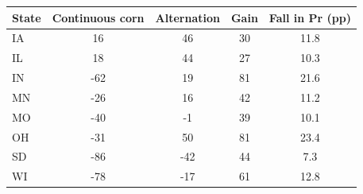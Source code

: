 \begin{tabular}{lcccc}
\toprule
State & Continuous corn & Alternation & Gain & Fall in Pr (pp)\\
\midrule
IA & 16 & 46 & 30 & 11.8 \\
IL & 18 & 44 & 27 & 10.3 \\
IN & -62 & 19 & 81 & 21.6 \\
MN & -26 & 16 & 42 & 11.2 \\
MO & -40 & -1 & 39 & 10.1 \\
OH & -31 & 50 & 81 & 23.4 \\
SD & -86 & -42 & 44 & 7.3 \\
WI & -78 & -17 & 61 & 12.8 \\
\bottomrule
\end{tabular}
